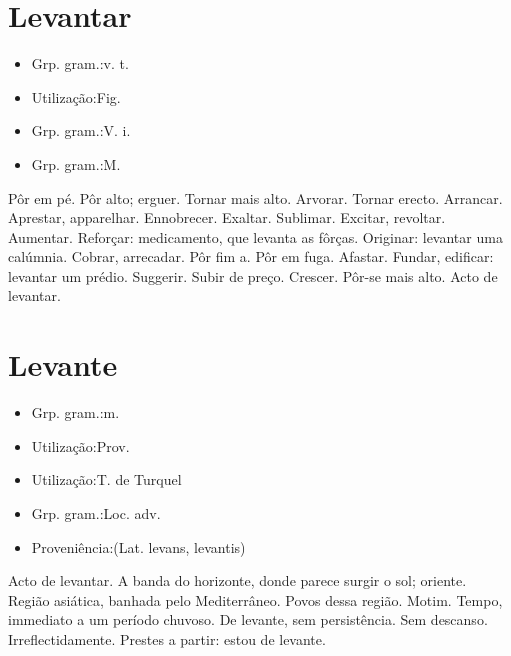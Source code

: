 \section{Levantar}
\begin{itemize}
\item {Grp. gram.:v. t.}
\end{itemize}
\begin{itemize}
\item {Utilização:Fig.}
\end{itemize}
\begin{itemize}
\item {Grp. gram.:V. i.}
\end{itemize}
\begin{itemize}
\item {Grp. gram.:M.}
\end{itemize}
Pôr em pé.
Pôr alto; erguer.
Tornar mais alto.
Arvorar.
Tornar erecto.
Arrancar.
Aprestar, apparelhar.
Ennobrecer.
Exaltar.
Sublimar.
Excitar, revoltar.
Aumentar.
Reforçar: \textunderscore medicamento, que levanta as fôrças\textunderscore .
Originar: \textunderscore levantar uma calúmnia\textunderscore .
Cobrar, arrecadar.
Pôr fim a.
Pôr em fuga.
Afastar.
Fundar, edificar: \textunderscore levantar um prédio\textunderscore .
Suggerir.
Subir de preço.
Crescer.
Pôr-se mais alto.
Acto de levantar.
\section{Levante}
\begin{itemize}
\item {Grp. gram.:m.}
\end{itemize}
\begin{itemize}
\item {Utilização:Prov.}
\end{itemize}
\begin{itemize}
\item {Utilização:T. de Turquel}
\end{itemize}
\begin{itemize}
\item {Grp. gram.:Loc. adv.}
\end{itemize}
\begin{itemize}
\item {Proveniência:(Lat. \textunderscore levans\textunderscore , \textunderscore levantis\textunderscore )}
\end{itemize}
Acto de levantar.
A banda do horizonte, donde parece surgir o sol; oriente.
Região asiática, banhada pelo Mediterrâneo.
Povos dessa região.
Motim.
Tempo, immediato a um período chuvoso.
\textunderscore De levante\textunderscore , sem persistência.
Sem descanso.
Irreflectidamente.
Prestes a partir: \textunderscore estou de levante\textunderscore .
